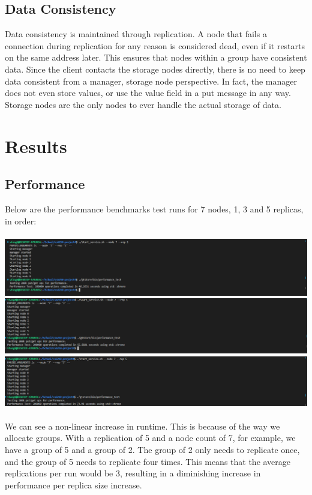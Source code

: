 \documentclass{article}
\begin{document}
\subsection{Data Consistency}
Data consistency is maintained through replication. A node that fails a connection during replication for any reason is considered dead, even if it restarts on the same address later.
This ensures that nodes within a group have consistent data. Since the client contacts the storage nodes directly, there is no need to keep data consistent from a manager, storage node
perspective. In fact, the manager does not even store values, or use the value field in a put message in any way. Storage nodes are the only nodes to ever handle the actual storage of data.
\section{Results}


\subsection{Performance}
Below are the performance benchmarks test runs for 7 nodes, 1, 3 and 5 replicas, in order:\\\\
\includegraphics[width=\linewidth]{img/Performance71.png}\\
\includegraphics[width=\linewidth]{img/Performance73.png}\\
\includegraphics[width=\linewidth]{img/Performance75.png}\\\\
We can see a non-linear increase in runtime. This is because of the way we allocate groups. With a replication of 5 and a node count of 7, for example,
we have a group of 5 and a group of 2. The group of 2 only needs to replicate once, and the group of 5 needs to replicate four times. This means that 
the average replications per run would be 3, resulting in a diminishing increase in performance per replica size increase.\\
\end{document}
